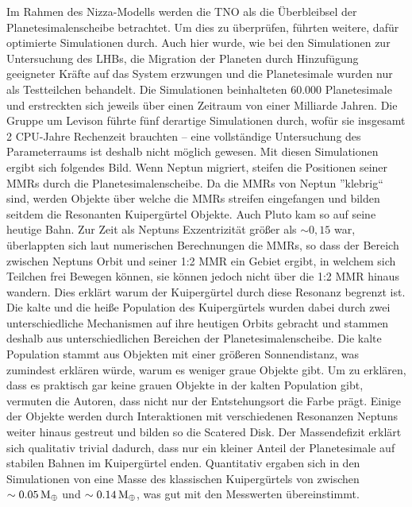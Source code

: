 \documentclass[12pt,a4paper,twoside]{article}
\renewcommand{\cite}{\citep}
\newcommand{\ME}{M_\oplus}
\begin{document}
\noindent
Im Rahmen des Nizza-Modells werden die TNO als die Überbleibsel der Planetesimalenscheibe betrachtet.
Um dies zu überprüfen, führten \cite{Levison2008} weitere, dafür optimierte Simulationen durch. Auch hier wurde, wie bei den Simulationen zur Untersuchung des LHBs, die Migration der Planeten durch Hinzufügung geeigneter Kräfte auf das System erzwungen und die Planetesimale wurden nur als Testteilchen behandelt\cite{Levison2008}. %
Die Simulationen beinhalteten 60.000 Planetesimale und erstreckten sich jeweils über einen Zeitraum von einer Milliarde Jahren\cite{Levison2008}. Die Gruppe um Levison führte fünf derartige Simulationen durch, wofür sie insgesamt 2 CPU-Jahre Rechenzeit brauchten – eine vollständige Untersuchung des Parameterraums ist deshalb nicht möglich gewesen\cite{Levison2008}.
Mit diesen Simulationen ergibt sich folgendes Bild. %
Wenn Neptun migriert, steifen die Positionen seiner MMRs durch die Planetesimalenscheibe. Da die MMRs von Neptun ''klebrig`` sind\cite{Levison2008}, werden Objekte über welche die MMRs streifen eingefangen und bilden seitdem die Resonanten Kuipergürtel Objekte. Auch Pluto kam so auf seine heutige Bahn.
Zur Zeit als Neptuns Exzentrizität größer als $\sim 0,15$ war, überlappten sich laut numerischen Berechnungen die MMRs, so dass der Bereich zwischen Neptuns Orbit und seiner 1:2 MMR ein Gebiet ergibt, in welchem sich Teilchen frei Bewegen können, sie können jedoch nicht über die 1:2 MMR hinaus wandern\cite{Levison2008}. Dies erklärt warum der Kuipergürtel durch diese Resonanz begrenzt ist.
Die kalte und die heiße Population des Kuipergürtels wurden dabei durch zwei unterschiedliche Mechanismen auf ihre heutigen Orbits gebracht und stammen deshalb aus unterschiedlichen Bereichen der Planetesimalenscheibe. Die kalte Population stammt aus Objekten mit einer größeren Sonnendistanz, was zumindest erklären würde, warum es weniger graue Objekte gibt. Um zu erklären, dass es praktisch gar keine grauen Objekte in der kalten Population gibt, vermuten die Autoren, dass nicht nur der Entstehungsort die Farbe prägt\cite{Levison2008}. %
Einige der Objekte werden durch Interaktionen mit verschiedenen Resonanzen Neptuns weiter hinaus gestreut und bilden so die Scatered Disk. %
Der Massendefizit erklärt sich qualitativ trivial dadurch, dass nur ein kleiner Anteil der Planetesimale auf stabilen Bahnen im Kuipergürtel enden. Quantitativ ergaben sich in den Simulationen von \cite{Levison2008} eine Masse des klassischen Kuipergürtels von zwischen $\sim\unit[0.05]{\ME}$ und $\sim\unit[0.14]{\ME}$, was gut mit den Messwerten übereinstimmt.
\end{document}
